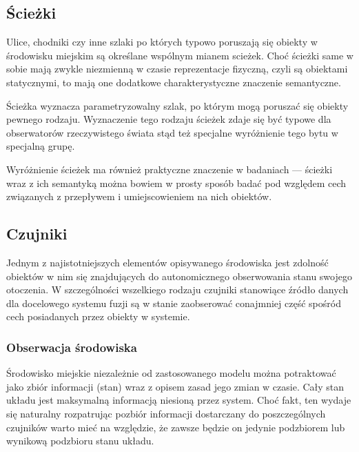 {\subsection{Ścieżki}
\par{
Ulice, chodniki czy inne szlaki po których typowo poruszają się obiekty w środowisku miejskim są określane wspólnym mianem scieżek. Choć ścieżki same w sobie mają zwykle niezmienną w czasie reprezentacje fizyczną, czyli są obiektami statycznymi, to mają one dodatkowe charakterystyczne znaczenie semantyczne.
}
\par{
Ścieżka wyznacza parametryzowalny szlak, po którym mogą poruszać się obiekty pewnego rodzaju. Wyznaczenie tego rodzaju ścieżek zdaje się być typowe dla obserwatorów rzeczywistego świata stąd też specjalne wyróżnienie tego bytu w specjalną grupę.
}
\par{
Wyróżnienie ścieżek ma również praktyczne znaczenie w badaniach --- ścieżki wraz z ich semantyką można bowiem w prosty sposób badać pod względem cech związanych z przepływem i umiejscowieniem na nich obiektów.
}
\subsection{Czujniki}
\par{
Jednym z najistotniejszych elementów opisywanego środowiska jest zdolność obiektów w nim się znajdujących do autonomicznego obserwowania stanu swojego otoczenia. W szczególności wszelkiego rodzaju czujniki stanowiące źródło danych dla docelowego systemu fuzji są w stanie zaobserować conajmniej część  spośród cech posiadanych przez obiekty w systemie.
}

\subsubsection{Obserwacja środowiska}
\par{
Środowisko miejskie niezależnie od zastosowanego modelu można potraktować jako zbiór informacji (stan) wraz z opisem zasad jego zmian w czasie. Cały stan układu jest maksymalną informacją niesioną przez system. Choć fakt, ten wydaje się naturalny rozpatrując pozbiór informacji dostarczany do poszczególnych czujników warto mieć na względzie, że zawsze będzie on jedynie podzbiorem lub wynikową podzbioru stanu układu.
}

}
